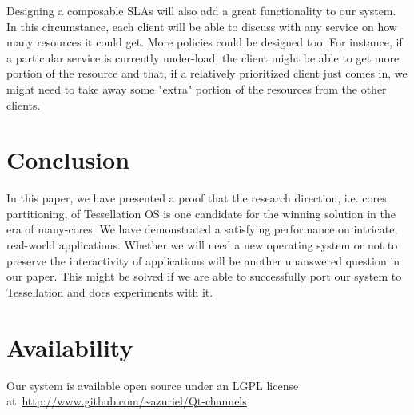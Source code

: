 \documentclass[letterpaper,twocolumn,10pt]{article}
\begin{document}
Designing a composable SLAs will also add a great functionality to our system. In this circumstance, each client will be able to discuss with any service on how many resources it could get. More policies could be designed too. For instance, if a particular service is currently under-load, the client might be able to get more portion of the resource and that, if a relatively prioritized client just comes in, we might need to take away some "extra" portion of the resources from the other clients.

\section{Conclusion}

In this paper, we have presented a proof that the research direction, i.e. cores partitioning, of Tessellation OS is one candidate for the winning solution in the era of many-cores. We have demonstrated a satisfying performance on intricate, real-world applications. Whether we will need a new operating system or not to preserve the interactivity of applications will be another unanswered question in our paper. This might be solved if we are able to successfully port our system to Tessellation and does experiments with it.

\section{Availability}

Our system is available open source under an LGPL license at~\url{http://www.github.com/~azuriel/Qt-channels}

\footnotesize{
}

\theendnotes
\end{document}
